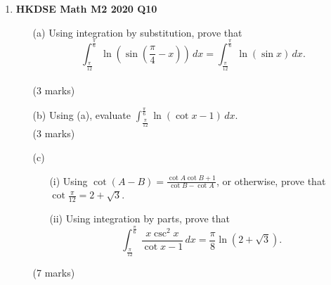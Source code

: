 \documentclass{report}
\begin{document}
\begin{enumerate}
	\newpage

	\item \textbf{HKDSE Math M2 2020 Q10}
	\begin{enumerate}
		\item [(a)]Using integration by substitution, prove that $$\displaystyle \int_{\tfrac{\pi}{12}}^{\tfrac{\pi}{6}}  \ln{\left(\sin{\left(\frac{\pi}{4} - x\right)}\right)}\,dx = \int_{\tfrac{\pi}{12}}^{\tfrac{\pi}{6}}  \ln{(\sin{x})}\,dx.$$ \\(3 marks)
		\item [(b)] Using (a), evaluate $\displaystyle \int_{\tfrac{\pi}{12}}^{\tfrac{\pi}{6}}  \ln{(\cot{x} - 1)}\,dx$. \\(3 marks)
		\item [(c)] 
		\begin{enumerate}
			\item [(i)] Using $\cot{(A-B)} = \displaystyle \frac{\cot{A}\cot{B}+1}{\cot{B} - \cot{A}}$, or otherwise, prove that $\displaystyle \cot{\frac{\pi}{12}} = 2 + \sqrt{3}$. 
			\item [(ii)] Using integration by parts, prove that $$\displaystyle\int_{\tfrac{\pi}{12}}^{\tfrac{\pi}{6}}  \frac{x\csc^2{x}}{\cot{x} -1}\,dx = \frac{\pi}{8} \ln{(2 + \sqrt{3})}.$$
		\end{enumerate}
	(7 marks)
	\end{enumerate}


\end{enumerate}
\end{document}
